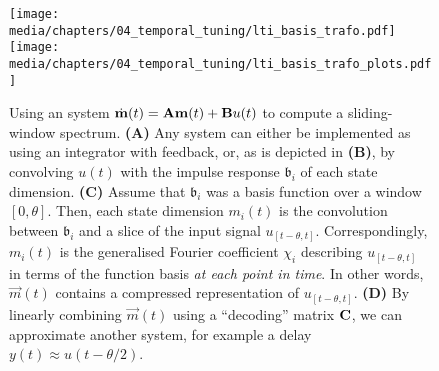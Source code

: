 \begin{figure}
	\centering
	\texttt{[image: media/chapters/04\_temporal\_tuning/lti\_basis\_trafo.pdf]}%
	{\label{fig:lti_basis_trafo_a}}%
	{\label{fig:lti_basis_trafo_b}}%
	{\label{fig:lti_basis_trafo_c}}%
	{\label{fig:lti_basis_trafo_d}}%
	\kern-158mm\texttt{[image: media/chapters/04\_temporal\_tuning/lti\_basis\_trafo\_plots.pdf]}\\[0.3cm]
	\caption[Using an LTI system to compute a sliding basis transformation]{Using an \LTI system $\dot{\mathbf{m}}(t) = \mathbf{A} \mathbf{m}(t) + \mathbf{B} u(t)$ to compute a sliding-window spectrum.
	\textbf{(A)} Any \LTI system can either be implemented as using an integrator with feedback, or, as is depicted in \textbf{(B)}, by convolving $u(t)$ with the impulse response $\mathfrak{b}_i$ of each state dimension.
	\textbf{(C)} Assume that $\mathfrak{b}_i$ was a basis function over a window $[0, \theta]$.
	Then, each state dimension $m_i(t)$ is the convolution between $\mathfrak{b}_i$ and a slice of the input signal $u_{[t - \theta, t]}$.
	Correspondingly, $m_i(t)$ is the generalised Fourier coefficient $\chi_i$ describing $u_{[t - \theta, t]}$ in terms of the function basis \emph{at each point in time}.
	In other words, $\vec m(t)$ contains a compressed representation of $u_{[t - \theta, t]}$.
	\textbf{(D)} By linearly combining $\vec m(t)$ using a \enquote{decoding} matrix $\mathbf{C}$, we can approximate another \LTI system, for example a delay $y(t) \approx u(t - \theta / 2)$.
	}
	\label{fig:lti_basis_trafo}
\end{figure}

